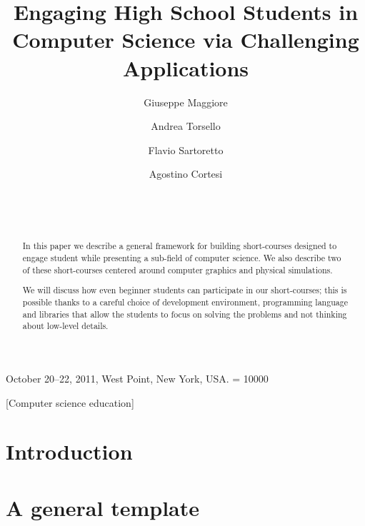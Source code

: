 \documentclass{sig-alternate}
\begin{document}
 {October 20--22, 2011, West Point, New York, USA.} 
\widowpenalty = 10000

\title{Engaging High School Students in Computer Science via Challenging Applications}

\author{
Giuseppe Maggiore \and Andrea Torsello \and Flavio Sartoretto \and Agostino Cortesi \\
       \\
       \\
       \\
}

\date{}

\maketitle

\begin{abstract}
In this paper we describe a general framework for building short-courses designed to engage student while presenting a sub-field of computer science. We also describe two of these short-courses centered around computer graphics and physical simulations.

We will discuss how even beginner students can participate in our short-courses; this is possible thanks to a careful choice of development environment, programming language and libraries that allow the students to focus on solving the problems and not thinking about low-level details.
\end{abstract}

[Computer science education] 



\section{Introduction}
\label{sec:intro}
 

\section{A general template}
\label{sec:short-courses_template}
 
\end{document}
